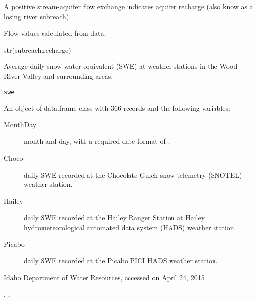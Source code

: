 \documentclass[a4paper]{book}
\begin{document}
%
\begin{Details}\relax
A positive stream-aquifer flow exchange indicates aquifer recharge
(also know as a losing river subreach).
\end{Details}
%
\begin{Source}\relax
Flow values calculated from  data.
\end{Source}
%
\begin{Examples}
\begin{ExampleCode}
str(subreach.recharge)

\end{ExampleCode}
\end{Examples}
%
\begin{Description}\relax
Average daily snow water equivalent (SWE) at weather stations in the
Wood River Valley and surrounding areas.
\end{Description}
%
\begin{Usage}
\begin{verbatim}
swe
\end{verbatim}
\end{Usage}
%
\begin{Format}
An object of data.frame class with 366 records and the following variables:
\begin{description}

\item[MonthDay] month and day, with a required date format of .
\item[Choco] daily SWE recorded at the Chocolate Gulch snow telemetry (SNOTEL)
weather station.
\item[Hailey] daily SWE recorded at the Hailey Ranger Station at Hailey
hydrometeorological automated data system (HADS) weather station.
\item[Picabo] daily SWE recorded at the Picabo PICI HADS weather station.

\end{description}

\end{Format}
%
\begin{Source}\relax
Idaho Department of Water Resources, accessed on April 24, 2015
\end{Source}
%
\begin{SeeAlso}\relax
{}, ,
\end{SeeAlso}
\end{document}
